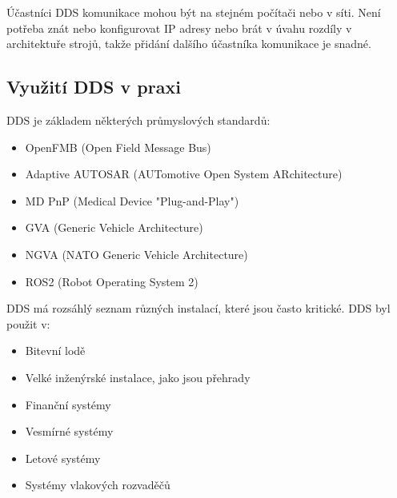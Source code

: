 Účastníci \acs{DDS} komunikace mohou být na stejném počítači nebo v síti. Není potřeba znát nebo konfigurovat IP adresy nebo brát v úvahu rozdíly v architektuře strojů, takže přidání dalšího účastníka komunikace je snadné.

\subsection{Využití \acs{DDS} v praxi}

\acl{DDS} je základem některých průmyslových standardů: \cite{DDS_usage}

\begin{itemize}
    \item OpenFMB (Open Field Message Bus)
    \item Adaptive AUTOSAR (AUTomotive Open System ARchitecture)
    \item MD PnP (Medical Device "Plug-and-Play")
    \item GVA (Generic Vehicle Architecture)
    \item NGVA (NATO Generic Vehicle Architecture)
    \item ROS2 (Robot Operating System 2) \\[0.2cm]
\end{itemize}

\acs{DDS} má rozsáhlý seznam různých instalací, které jsou často kritické. \acs{DDS} byl použit v: \cite{ROS2DDS}

\begin{itemize}
    \item Bitevní lodě
    \item Velké inženýrské instalace, jako jsou přehrady
    \item Finanční systémy
    \item Vesmírné systémy
    \item Letové systémy
    \item Systémy vlakových rozvaděčů
\end{itemize}